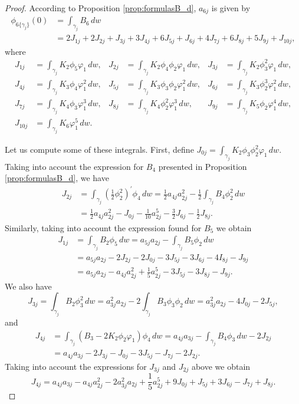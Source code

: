 \begin{proof}
According to Proposition \ref{prop:formulasB_d}, $a_{6j}$ is given by
\begin{align*}
\phi_{6\{\gamma_j\}}(0) &= \int_{\gamma_j}B_6\,dw\\
  &= 2J_{1j}+2J_{2j}+J_{3j}+3J_{4j}+6J_{5j}+J_{6j}+4J_{7j}+6J_{8j}+5J_{9j}+J_{10j}, 
\end{align*}
where
\begin{align*}
J_{1j}&=\int_{\gamma_j}K_2\phi_5\varphi_1\,dw, &
J_{2j}&=\int_{\gamma_j}K_2\phi_4\phi_2\varphi_1\,dw, & 
J_{3j}&=\int_{\gamma_j}K_2\phi_3^2\varphi_1\,dw, \\
J_{4j}&=\int_{\gamma_j}K_3\phi_4\varphi_1^2\,dw, &
J_{5j}&=\int_{\gamma_j}K_3\phi_3\phi_2\varphi_1^2\,dw, &
J_{6j}&=\int_{\gamma_j}K_3\phi_2^3\varphi_1^2\,dw, \\
J_{7j}&=\int_{\gamma_j}K_4\phi_3\varphi_1^3\,dw, &
J_{8j}&=\int_{\gamma_j}K_4\phi_2^2\varphi_1^3\,dw, &
J_{9j}&=\int_{\gamma_j}K_5\phi_2\varphi_1^4\,dw, \\
J_{10j}&=\int_{\gamma_j}K_6\varphi_1^5\,dw. & & 
\end{align*}

Let us compute some of these integrals. First, define $J_{0j}=\int_{\gamma_j}K_2\phi_3\phi_2^2\varphi_1\,dw$. Taking into account the expression for $B_4$ presented in Proposition \ref{prop:formulasB_d}, we have
\begin{align*}
J_{2j}	&= \int_{\gamma_j}\left(\frac{1}{2}\phi_2^2\right)^{\prime}\phi_4\,dw=\frac{1}{2}a_{4j}a_{2j}^2-\frac{1}{2}\int_{\gamma_j}B_4\phi_2^2\,dw \\
	&= \frac{1}{2}a_{4j}a_{2j}^2-J_{0j}-\frac{1}{10}a_{2j}^5-\frac{3}{2}J_{6j}-\frac{1}{2}J_{8j}.
\end{align*}
Similarly, taking into account the expression found for $B_5$ we obtain
\begin{align*}
J_{1j} 	&= \int_{\gamma_j}B_2\phi_5\,dw=a_{5j}a_{2j}-\int_{\gamma_j}B_5\phi_2\,dw \\
	&= a_{5j}a_{2j}-2J_{2j}-2J_{0j}-3J_{5j}-3J_{6j}-4I_{8j}-J_{9j} \\
	&= a_{5j}a_{2j}-a_{4j}a_{2j}^2+\frac{1}{5}a_{2j}^5-3J_{5j}-3J_{8j}-J_{9j}.
\end{align*}
We also have
\[ J_{3j}=\int_{\gamma_j}B_2\phi_3^2\,dw=a_{3j}^2a_{2j}-2\int_{\gamma_j}B_3\phi_3\phi_2\,dw=a_{3j}^2a_{2j}-4J_{0j}-2J_{5j}, \]
and
\begin{align*}
J_{4j}	&= \int_{\gamma_j}(B_3-2K_2\phi_2\varphi_1)\phi_4\,dw=a_{4j}a_{3j}-\int_{\gamma_j}B_4\phi_3\,dw-2J_{2j} \\
	&= a_{4j}a_{3j}-2J_{3j}-J_{0j}-3J_{5j}-J_{7j}-2J_{2j}.
\end{align*}
Taking into account the expressions for $J_{3j}$ and $J_{2j}$ above we obtain
\[ J_{4j}=a_{4j}a_{3j}-a_{4j}a_{2j}^2-2a_{3j}^2a_{2j}+\frac{1}{5}a_{2j}^5+9J_{0j}+J_{5j}+3J_{6j}-J_{7j}+J_{8j}. \]


\end{proof}
